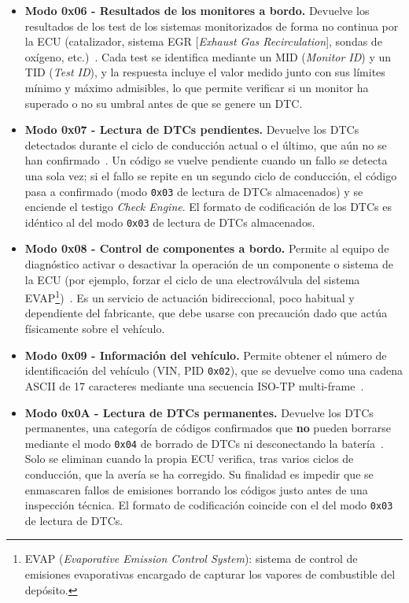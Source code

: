 \begin{itemize}
    \item \textbf{Modo 0x06 - Resultados de los monitores a bordo.} Devuelve los resultados de los test de los sistemas monitorizados de forma no continua por la ECU (catalizador, sistema EGR [\textit{Exhaust Gas Recirculation}], sondas de oxígeno, etc.)~\cite{SAEJ1979:2014}. Cada test se identifica mediante un MID (\textit{Monitor ID}) y un TID (\textit{Test ID}), y la respuesta incluye el valor medido junto con sus límites mínimo y máximo admisibles, lo que permite verificar si un monitor ha superado o no su umbral antes de que se genere un DTC.

    \item \textbf{Modo 0x07 - Lectura de DTCs pendientes.} Devuelve los DTCs detectados durante el ciclo de conducción actual o el último, que aún no se han confirmado~\cite{SAEJ1979:2014}. Un código se vuelve pendiente cuando un fallo se detecta una sola vez; si el fallo se repite en un segundo ciclo de conducción, el código pasa a confirmado (modo \texttt{0x03} de lectura de DTCs almacenados) y se enciende el testigo \textit{Check Engine}. El formato de codificación de los DTCs es idéntico al del modo \texttt{0x03} de lectura de DTCs almacenados.

    \item \textbf{Modo 0x08 - Control de componentes a bordo.} Permite al equipo de diagnóstico activar o desactivar la operación de un componente o sistema de la ECU (por ejemplo, forzar el ciclo de una electroválvula del sistema EVAP\footnote{EVAP (\textit{Evaporative Emission Control System}): sistema de control de emisiones evaporativas encargado de capturar los vapores de combustible del depósito.})~\cite{SAEJ1979:2014}. Es un servicio de actuación bidireccional, poco habitual y dependiente del fabricante, que debe usarse con precaución dado que actúa físicamente sobre el vehículo.

    \item \textbf{Modo 0x09 - Información del vehículo.} Permite obtener el número de identificación del vehículo (VIN, PID \texttt{0x02}), que se devuelve como una cadena ASCII de 17 caracteres mediante una secuencia ISO-TP multi-frame~\cite{SAEJ1979:2014, ISO15765-2:2016}.
\vspace{1cm}
    \item \textbf{Modo 0x0A - Lectura de DTCs permanentes.} Devuelve los DTCs permanentes, una categoría de códigos confirmados que \textbf{no} pueden borrarse mediante el modo \texttt{0x04} de borrado de DTCs ni desconectando la batería~\cite{SAEJ1979:2014}. Solo se eliminan cuando la propia ECU verifica, tras varios ciclos de conducción, que la avería se ha corregido. Su finalidad es impedir que se enmascaren fallos de emisiones borrando los códigos justo antes de una inspección técnica. El formato de codificación coincide con el del modo \texttt{0x03} de lectura de DTCs.
\end{itemize}

